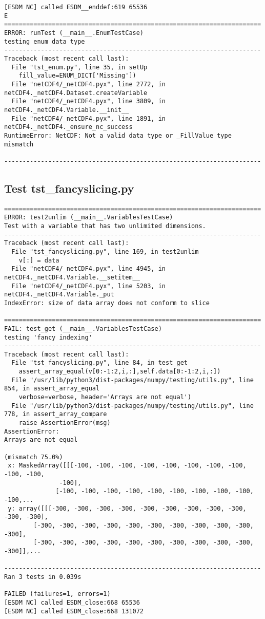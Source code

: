 \begin{verbatim}
[ESDM NC] called ESDM__enddef:619 65536
E
======================================================================
ERROR: runTest (__main__.EnumTestCase)
testing enum data type
----------------------------------------------------------------------
Traceback (most recent call last):
  File "tst_enum.py", line 35, in setUp
    fill_value=ENUM_DICT['Missing'])
  File "netCDF4/_netCDF4.pyx", line 2772, in netCDF4._netCDF4.Dataset.createVariable
  File "netCDF4/_netCDF4.pyx", line 3809, in netCDF4._netCDF4.Variable.__init__
  File "netCDF4/_netCDF4.pyx", line 1891, in netCDF4._netCDF4._ensure_nc_success
RuntimeError: NetCDF: Not a valid data type or _FillValue type mismatch

----------------------------------------------------------------------
\end{verbatim}

\subsection{Test tst\_fancyslicing.py}

\begin{verbatim}
======================================================================
ERROR: test2unlim (__main__.VariablesTestCase)
Test with a variable that has two unlimited dimensions.
----------------------------------------------------------------------
Traceback (most recent call last):
  File "tst_fancyslicing.py", line 169, in test2unlim
    v[:] = data
  File "netCDF4/_netCDF4.pyx", line 4945, in netCDF4._netCDF4.Variable.__setitem__
  File "netCDF4/_netCDF4.pyx", line 5203, in netCDF4._netCDF4.Variable._put
IndexError: size of data array does not conform to slice

======================================================================
FAIL: test_get (__main__.VariablesTestCase)
testing 'fancy indexing'
----------------------------------------------------------------------
Traceback (most recent call last):
  File "tst_fancyslicing.py", line 84, in test_get
    assert_array_equal(v[0:-1:2,i,:],self.data[0:-1:2,i,:])
  File "/usr/lib/python3/dist-packages/numpy/testing/utils.py", line 854, in assert_array_equal
    verbose=verbose, header='Arrays are not equal')
  File "/usr/lib/python3/dist-packages/numpy/testing/utils.py", line 778, in assert_array_compare
    raise AssertionError(msg)
AssertionError:
Arrays are not equal

(mismatch 75.0%)
 x: MaskedArray([[[-100, -100, -100, -100, -100, -100, -100, -100, -100, -100,
               -100],
              [-100, -100, -100, -100, -100, -100, -100, -100, -100, -100,...
 y: array([[[-300, -300, -300, -300, -300, -300, -300, -300, -300, -300, -300],
        [-300, -300, -300, -300, -300, -300, -300, -300, -300, -300, -300],
        [-300, -300, -300, -300, -300, -300, -300, -300, -300, -300, -300]],...

----------------------------------------------------------------------
Ran 3 tests in 0.039s

FAILED (failures=1, errors=1)
[ESDM NC] called ESDM_close:668 65536
[ESDM NC] called ESDM_close:668 131072
\end{verbatim}

